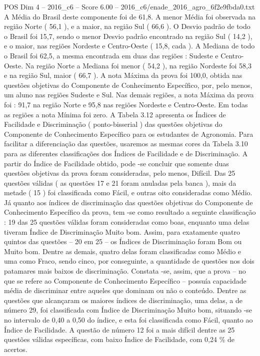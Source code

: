 \begin{textsample}{POS Dim 4 – 2016\_c6 – Score 6.00 – 2016\_c6/enade\_2016\_agro\_6f2e9fbda0.txt}
A Média do Brasil deste componente foi de 61,8.
A menor Média foi observada na região Norte ( 56,1 ), e a maior, na região Sul ( 66,6 ).
O Desvio padrão de todo o Brasil foi 15,7, sendo o menor Desvio padrão encontrado na região Sul ( 14,2 ), e o maior, nas regiões Nordeste e Centro-Oeste ( 15,8, cada ).
A Mediana de todo o Brasil foi 62,5, a mesma encontrada em duas das regiões : Sudeste e Centro-Oeste.
Na região Norte a Mediana foi menor ( 54,2 ), na região Nordeste foi 58,3 e na região Sul, maior ( 66,7 ).
A nota Máxima da prova foi 100,0, obtida nas questões objetivas do Componente de Conhecimento Específico, por, pelo menos, um aluno nas regiões Sudeste e Sul.
Nas demais regiões, a nota Máxima da prova foi : 91,7 na região Norte e 95,8 nas regiões Nordeste e Centro-Oeste.
Em todas as regiões a nota Mínima foi zero.
A Tabela 3.12 apresenta os Índices de Facilidade e Discriminação ( ponto-bisserial ) das questões objetivas do Componente de Conhecimento Específico para os estudantes de Agronomia.
Para facilitar a diferenciação das questões, usaremos as mesmas cores da Tabela 3.10 para as diferentes classificações dos Índices de Facilidade e de Discriminação.
A partir do Índice de Facilidade obtido, pode -se concluir que somente duas questões objetivas da prova foram consideradas, pelo menos, Difícil.
Das 25 questões válidas ( as questões 17 e 21 foram anuladas pela banca ), mais da metade ( 15 ) foi classificada como Fácil, e outras oito consideradas como Médio.
Já quanto aos índices de discriminação das questões objetivas do Componente de Conhecimento Específico da prova, tem -se como resultado a seguinte classificação : 19 das 25 questões válidas foram consideradas como boas, enquanto uma delas tiveram Índice de Discriminação Muito bom.
Assim, para exatamente quatro quintos das questões – 20 em 25 – os Índices de Discriminação foram Bom ou Muito bom.
Dentre as demais, quatro delas foram classificadas como Médio e uma como Fraco, sendo cinco, por conseguinte, a quantidade de questões nos dois patamares mais baixos de discriminação.
Constata -se, assim, que a prova – no que se refere ao Componente de Conhecimento Específico – possuía capacidade média de discriminar entre aqueles que dominam ou não o conteúdo.
Dentre as questões que alcançaram os maiores índices de discriminação, uma delas, a de número 29, foi classificada com Índice de Discriminação Muito bom, situando -se no intervalo de 0,40 a 0,50 do índice, e esta foi classificada como Fácil, quanto ao Índice de Facilidade.
A questão de número 12 foi a mais difícil dentre as 25 questões válidas específicas, com baixo Índice de Facilidade, com 0,24 \% de acertos.

\end{textsample}

